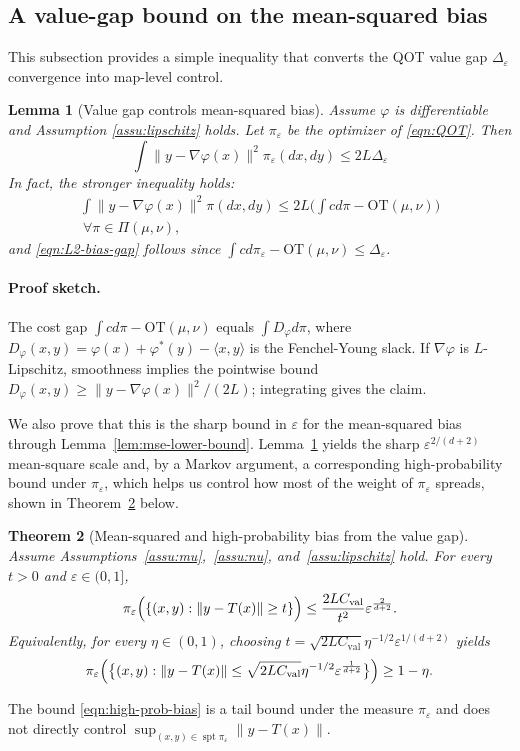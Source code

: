\documentclass{article}
\theoremstyle{plain}
\newtheorem{theorem}{Theorem}[section]
\newtheorem{lemma}[theorem]{Lemma}
\theoremstyle{definition}
\theoremstyle{remark}
\numberwithin{equation}{section}
\DeclareMathOperator{\spt}{spt}
\newcommand{\OT}{\mathrm{OT}}
\begin{document}
\subsection{A value-gap bound on the mean-squared bias}\label{sec:L2-bias-gap}
This subsection provides a simple inequality that converts the QOT value gap $\Delta_\varepsilon$ convergence into map-level control.
\begin{lemma}[Value gap controls mean-squared bias]\label{lem:L2-bias-gap}
Assume $\varphi$ is differentiable and Assumption \ref{assu:lipschitz} holds.
Let $\pi_\varepsilon$ be the optimizer of \eqref{eqn:QOT}. 
Then
\begin{equation}\label{eqn:L2-bias-gap}
\int\|y-\nabla\varphi(x)\|^2\pi_\varepsilon(dx,dy)\le2L\Delta_\varepsilon
\end{equation}
In fact, the stronger inequality holds:
$$
\begin{aligned}
\int\|y-\nabla\varphi(x)\|^2\pi(dx,dy)\le2L\Big(\int cd\pi-\OT(\mu,\nu)\Big)\\
\ \forall\pi\in\Pi(\mu,\nu),
\end{aligned}
$$
and \eqref{eqn:L2-bias-gap} follows since $\int cd\pi_\varepsilon-\OT(\mu,\nu)\le\Delta_\varepsilon$.
\end{lemma}
\paragraph{Proof sketch.}
The cost gap $\int cd\pi-\OT(\mu,\nu)$ equals $\int D_\varphi d\pi$, where $D_\varphi(x,y)=\varphi(x)+\varphi^*(y)-\langle x,y\rangle$ is the Fenchel-Young slack.
If $\nabla\varphi$ is $L$-Lipschitz, smoothness implies the pointwise bound $D_\varphi(x,y)\ge\|y-\nabla\varphi(x)\|^2/(2L)$; integrating gives the claim.

We also prove that this is the sharp bound in $\varepsilon$ for the mean-squared bias through Lemma~\ref{lem:mse-lower-bound}.
Lemma~\ref{lem:L2-bias-gap} yields the sharp $\varepsilon^{2/(d+2)}$ mean-square scale and, by a Markov argument, a corresponding high-probability bound under $\pi_\varepsilon$, which helps us control how most of the weight of $\pi_\varepsilon$ spreads, shown in Theorem~\ref{thm:mse-highprob-bias} below.
\begin{theorem}[Mean-squared and high-probability bias from the value gap]\label{thm:mse-highprob-bias}
Assume Assumptions~\ref{assu:mu},~\ref{assu:nu}, and~\ref{assu:lipschitz} hold.
For every $t>0$ and $\varepsilon\in(0,1]$,
\begin{equation}\label{eqn:high-prob-bias}
\pi_\varepsilon\Bigl(\{(x,y):\|y-T(x)\|\ge t\}\Bigr)\le\frac{2LC_{\mathrm{val}}}{t^2}\varepsilon^{\frac{2}{d+2}}.
\end{equation}
Equivalently, for every $\eta\in(0,1)$, choosing $t=\sqrt{2L C_{\mathrm{val}}}\eta^{-1/2}\varepsilon^{1/(d+2)}$ yields
\[
\pi_\varepsilon\Bigl(\bigl\{(x,y):\|y-T(x)\|\le\sqrt{2L C_{\mathrm{val}}}\eta^{-1/2}\varepsilon^{\frac1{d+2}}\bigr\}\Bigr)\ge1-\eta.
\]
\end{theorem}
The bound \eqref{eqn:high-prob-bias} is a tail bound under the measure $\pi_\varepsilon$ and does not directly control $\sup_{(x,y)\in\spt\pi_\varepsilon}\|y-T(x)\|$.
\end{document}
